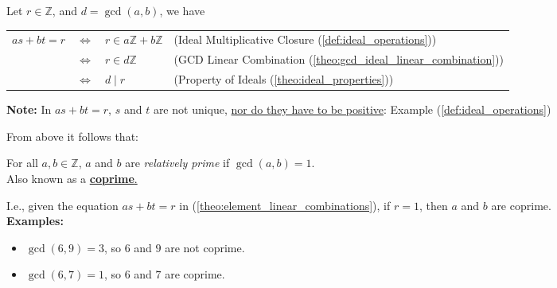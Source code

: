 \begin{Proof}

    Let $r\in\mathbb{Z}$, and $d=\gcd(a,b)$, we have
    
    \begin{center}
        \setlength{\tabcolsep}{4pt} %
\renewcommand{\arraystretch}{1.2} %

        \begin{tabular}{p{2cm} p{1cm} p{2cm} p{5.5cm}}
            $as + bt = r$ & $\Longleftrightarrow$ & $r \in a\mathbb{Z} + b\mathbb{Z}$ & (Ideal Multiplicative Closure (\ref{def:ideal_operations})) \\
            & $\Longleftrightarrow$ & $r \in d\mathbb{Z}$ & (GCD Linear Combination (\ref{theo:gcd_ideal_linear_combination})) \\
            & $\Longleftrightarrow$ & $d \mid r$ & (Property of Ideals (\ref{theo:ideal_properties})) \\
        \end{tabular}
    \end{center}
\end{Proof}
\begin{Note}
    \textbf{Note:} In $as + bt = r$, $s$ and $t$ are not unique, \underline{nor do they have to be positive}: Example (\ref{def:ideal_operations})
\end{Note}

\noindent
From above it follows that:

\begin{Def}

    \label{def:relatively_prime}

    For all \(a, b \in \mathbb{Z}\), \(a\) and \(b\) are \textit{relatively prime} if \(\gcd(a, b) = 1\).\\
    
    \noindent
    Also known as a \underline{\textbf{coprime}.}

\end{Def}
I.e., given the equation $as + bt = r$ in (\ref{theo:element_linear_combinations}), if $r=1$, then $a$ and $b$ are coprime.\\

\noindent
\textbf{Examples:}
\begin{itemize}
    \item $\gcd(6,9)=3$, so $6$ and $9$ are not coprime.
    \item $\gcd(6,7)=1$, so $6$ and $7$ are coprime.
\end{itemize}

